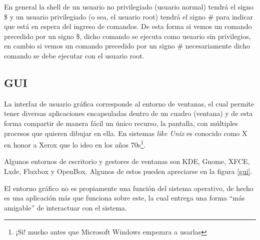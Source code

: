 En general la shell de un usuario no privilegiado (usuario normal) tendrá el
signo \$ y un usuario privilegiado (o sea, el usuario root) tendrá el signo \#
para indicar que está en espera del ingreso de comandos. De esta forma si vemos
un comando precedido por un signo \$, dicho comando se ejecuta como usuario sin
privilegios, en cambio si vemos un comando precedido por un signo \#
necesariamente dicho comando se debe ejecutar con el usuario root.

\subsection{GUI}
La interfaz de usuario gráfica corresponde al entorno de ventanas, el cual
permite tener diversas aplicaciones encapsuladas dentro de un cuadro (ventana) y
de esta forma compartir de manera fácil un único recurso, la pantalla, con
múltiples procesos que quieren dibujar en ella. En sistemas \textit{like Unix}
es conocido como X en honor a Xerox que lo ideo en los años 70s\footnote{¡Si!
mucho antes que Microsoft Windows empezara a usarlas}.

Algunos entornos de escritorio y gestores de ventanas son KDE, Gnome, XFCE,
Lxde, Fluxbox y OpenBox. Algunos de estos pueden apreciarse en la figura
\ref{gui}.

El entorno gráfico no es propiamente una función del sistema operativo, de hecho
es una aplicación más que funciona sobre este, la cual entrega una forma ``más
amigable'' de interactuar con el sistema.

